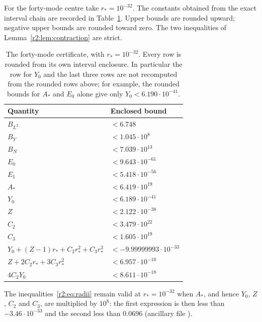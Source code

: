 For the forty-mode centre take $r_*=10^{-32}$. The constants obtained from the exact interval chain are recorded in Table~\ref{r2:tab:constants}. Upper bounds are rounded upward; negative upper bounds are rounded toward zero. The two inequalities of Lemma~\ref{r2:lem:contraction} are strict.
\begin{table}[htbp]
\centering
\begin{tabular}{ll}
\toprule
Quantity & Enclosed bound\\
\midrule
$B_{L^2}$ & $<6.748$\\
$B_Y$ & $<1.045\cdot10^8$\\
$B_N$ & $<7.039\cdot10^{13}$\\
$E_0$ & $<9.643\cdot10^{-61}$\\
$E_1$ & $<5.418\cdot10^{-56}$\\
$A_*$ & $<6.419\cdot10^{19}$\\
$Y_0$ & $<6.189\cdot10^{-41}$\\
$Z$ & $<2.122\cdot10^{-38}$\\
$C_2$ & $<3.479\cdot10^{22}$\\
$C_3$ & $<1.605\cdot10^{19}$\\
$Y_0+(Z-1)r_*+C_2r_*^2+C_3r_*^3$ & $<-9.99999993\cdot10^{-33}$\\
$Z+2C_2r_*+3C_3r_*^2$ & $<6.957\cdot10^{-10}$\\
$4C_2Y_0$ & $<8.611\cdot10^{-18}$\\
\bottomrule
\end{tabular}
\caption{The forty-mode certificate, with $r_*=10^{-32}$. Every row is rounded from its own interval enclosure. In particular the row for $Y_0$ and the last three rows are not recomputed from the rounded rows above; for example, the rounded bounds for $A_*$ and $E_0$ alone give only $Y_0<6.190\cdot10^{-41}$.}\label{r2:tab:constants}
\end{table}

The inequalities~\eqref{r2:eq:radii} remain valid at $r_*=10^{-32}$ when $A_*$, and hence $Y_0$, $Z$, $C_2$ and $C_3$, are multiplied by $10^8$: the first expression is then less than $-3.46\cdot10^{-33}$ and the second less than $0.0696$ (ancillary file ).


